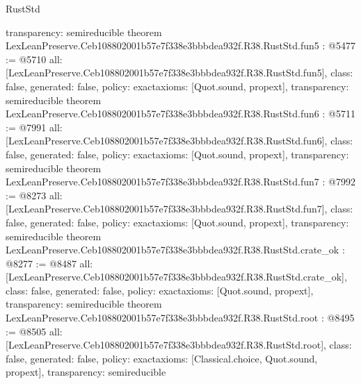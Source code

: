 \begin{lexlean}{RustStd}
\begin{coremodule}
{  transparency: semireducible
}
theorem LexLeanPreserve.Ceb108802001b57e7f338e3bbbdea932f.R38.RustStd.fun5 : @5477 := @5710 {
  all: [LexLeanPreserve.Ceb108802001b57e7f338e3bbbdea932f.R38.RustStd.fun5],
  class: false,
  generated: false,
  policy: exact{axioms: [Quot.sound, propext]},
  transparency: semireducible
}
theorem LexLeanPreserve.Ceb108802001b57e7f338e3bbbdea932f.R38.RustStd.fun6 : @5711 := @7991 {
  all: [LexLeanPreserve.Ceb108802001b57e7f338e3bbbdea932f.R38.RustStd.fun6],
  class: false,
  generated: false,
  policy: exact{axioms: [Quot.sound, propext]},
  transparency: semireducible
}
theorem LexLeanPreserve.Ceb108802001b57e7f338e3bbbdea932f.R38.RustStd.fun7 : @7992 := @8273 {
  all: [LexLeanPreserve.Ceb108802001b57e7f338e3bbbdea932f.R38.RustStd.fun7],
  class: false,
  generated: false,
  policy: exact{axioms: [Quot.sound, propext]},
  transparency: semireducible
}
theorem LexLeanPreserve.Ceb108802001b57e7f338e3bbbdea932f.R38.RustStd.crate_ok : @8277 := @8487 {
  all: [LexLeanPreserve.Ceb108802001b57e7f338e3bbbdea932f.R38.RustStd.crate_ok],
  class: false,
  generated: false,
  policy: exact{axioms: [Quot.sound, propext]},
  transparency: semireducible
}
theorem LexLeanPreserve.Ceb108802001b57e7f338e3bbbdea932f.R38.RustStd.root : @8495 := @8505 {
  all: [LexLeanPreserve.Ceb108802001b57e7f338e3bbbdea932f.R38.RustStd.root],
  class: false,
  generated: false,
  policy: exact{axioms: [Classical.choice, Quot.sound, propext]},
  transparency: semireducible
}


\end{coremodule}
\end{lexlean}
